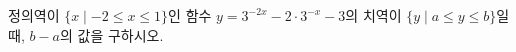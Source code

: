 정의역이 $\{x \mid -2\le x\le 1\}$인 함수 $y=3^{-2x}-2\cdot 3^{-x}-3$의 치역이 $\{y \mid a\le y\le b\}$일 때, $b-a$의 값을 구하시오.
